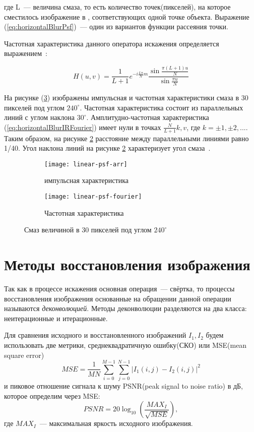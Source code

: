 где L~--- величина смаза, то есть количество точек(пикселей), на которое сместилось изображение в , соответствующих одной точке объекта. Выражение (\ref{eq:horizontalBlurPsf})~--- один из вариантов функции рассеяния точки.

Частотная характеристика данного оператора искажения определяется выражением~\cite{iterableImageRestorationBiemonLangdeik}:

\begin{equation}\label{eq:horizontalBlurIRFourier}
H(u,v) = \frac{1}{L+1}e^{-i\frac{L\pi}{N}m}\frac{\sin\frac{\pi(L+1)u}{N}}{\sin\frac{\pi u}{N}}
\end{equation}

На рисунке (\ref{fig:linearPsf}) изображены импульсная и частотная характеристики смаза в 30 пикселей под углом $240^\circ$. Частотная характеристика состоит из параллельных линий с углом наклона $30^\circ$. Амплитудно-частотная характеристика (\ref{eq:horizontalBlurIRFourier}) имеет нули в точках $\frac{N}{L+1}k, v$, где $k = \pm 1, \pm2, ...$. Таким образом, на рисунке \ref{fig:linearPsfFourier} расстояние между параллельными линиями равно 1/40. Угол наклона линий на рисунке \ref{fig:linearPsfFourier} характеризует угол смаза~\cite{iterableImageRestorationBiemonLangdeik}.
\begin{figure}
	\begin{subfigure}[b]{0.5\textwidth}
		\texttt{[image: linear-psf-arr]}
		\caption{импульсная характеристика}
		\label{fig:linearPsfArr}
	\end{subfigure}%
	\begin{subfigure}[b]{0.5\textwidth}
		\texttt{[image: linear-psf-fourier]}%
		\caption{Частотная характеристика}
		\label{fig:linearPsfFourier}
	\end{subfigure}%
	\caption{Смаз величиной в 30 пикселей под углом $240^{\circ}$}\label{fig:linearPsf}
\end{figure}

\section{Методы восстановления изображения}
Так как в процессе искажения основная операция~--- свёртка, то процессы восстановления изображения основанные на обращении данной операции называются \textit{деконволюцией}. Методы деконволюции разделяются на два класса: неитерационные и итерационные.

Для сравнения исходного и восстановленного изображений $I_1, I_2$ будем использовать две метрики, среднеквадратичную ошибку(СКО) или MSE(mean square error)
\begin{equation}\label{eq:mse}
MSE = \frac{1}{MN}\sum_{i=0}^{M-1}\sum_{j=0}^{N-1}\left| I_1(i,j)-I_2(i,j)\right|^2
\end{equation}
и пиковое отношение сигнала к шуму PSNR(peak signal to noise ratio) в дБ, которое определим через MSE: 
\begin{equation}\label{eq:psnr}
PSNR = 20\log_{10}\left(\frac{MAX_I}{\sqrt{MSE}}\right),
\end{equation}
где $MAX_I$~--- максимальная яркость исходного изображения.

